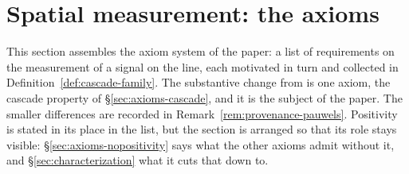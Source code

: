 %

\section{Spatial measurement: the axioms}\label{sec:axioms}

This section assembles the axiom system of the paper: a list of requirements on the
measurement of a signal on the line, each motivated in turn and collected in
Definition~\ref{def:cascade-family}. The substantive change from
 is one axiom, the cascade property of
\S\ref{sec:axioms-cascade}, and it is the subject of the paper. The smaller differences are
recorded in Remark~\ref{rem:provenance-pauwels}. Positivity is stated in its place in the
list, but the section is arranged so that its role stays visible:
\S\ref{sec:axioms-nopositivity} says what the other axioms admit without it, and
\S\ref{sec:characterization} what it cuts that down to.

